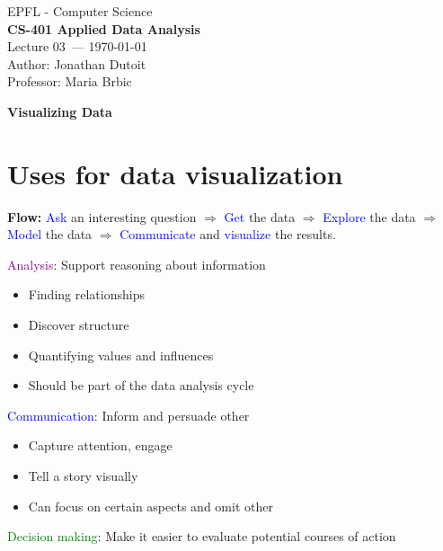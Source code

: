 \documentclass[11pt]{article}
\newcommand{\coursename}{CS-401 Applied Data Analysis}
\newcommand{\lecturenum}{03}
\newcommand{\lecturedate}{\today}
\newcommand{\professor}{Maria Brbic}
\begin{document}
\begin{center}
  {\large EPFL - Computer Science} \\[0.5em]
  {\Large \textbf{\coursename}} \\[0.5em]
  {\large Lecture \lecturenum\ --- \lecturedate} \\[0.5em]
  {\large Author: Jonathan Dutoit} \\[0.5em]
  {\large Professor: \professor} \\[0.5em]
\end{center}

\vspace{2cm}

\begin{center}
  {\LARGE \textbf{Visualizing Data}}
\end{center}

\vspace{1cm}

\section*{Uses for data visualization}

\textbf{Flow:} \textcolor{blue}{Ask} an interesting question $\Rightarrow$ \textcolor{blue}{Get} the data $\Rightarrow$  \textcolor{blue}{Explore} the data $\Rightarrow$  \textcolor{blue}{Model} the data $\Rightarrow$  \textcolor{blue}{Communicate} and \textcolor{blue}{visualize} the results. 

\textcolor{purple}{Analysis}: Support reasoning about information
\begin{itemize}
	\item Finding relationships
	\item Discover structure
	\item Quantifying values and influences
	\item Should be part of the data analysis cycle
\end{itemize}

\textcolor{blue}{Communication}: Inform and persuade other
\begin{itemize}
	\item Capture attention, engage
	\item Tell a story visually
	\item Can focus on certain aspects and omit other
\end{itemize}

\textcolor{green}{Decision making}: Make it easier to evaluate potential courses of action
\end{document}
